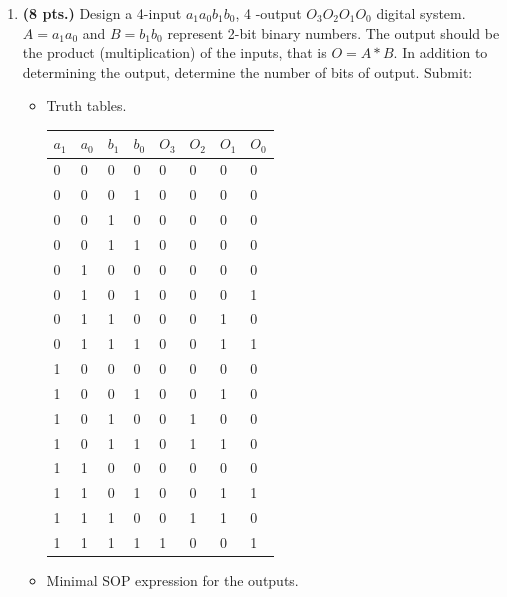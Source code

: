 \begin{enumerate}
\item {\bf (8 pts.)}
Design a 4-input $a_1 a_0 b_1 b_0$, 4 -output $O_3 O_2 O_1 O_0$
digital system.  $A=a_1 a_0$ and $B=b_1 b_0$ represent 2-bit binary
numbers.  The output should be the product (multiplication) of the inputs, 
that is $O = A*B$.  In addition to determining the output, determine the
number of bits of output. Submit:
\begin{itemize}
\item Truth tables.

\begin{solution}{
\begin{tabular}{l|l|l|l||l|l|l|l}
$a_1$ & $a_0$ & $b_1$ & $b_0$ & $O_3$ & $O_2$ & $O_1$ & $O_0$ \\ \hline
0&0&0&0 &0&0&0&0 \\ \hline
0&0&0&1 &0&0&0&0 \\ \hline
0&0&1&0 &0&0&0&0 \\ \hline
0&0&1&1 &0&0&0&0 \\ \hline
0&1&0&0 &0&0&0&0 \\ \hline
0&1&0&1 &0&0&0&1 \\ \hline
0&1&1&0 &0&0&1&0 \\ \hline
0&1&1&1 &0&0&1&1 \\ \hline
1&0&0&0 &0&0&0&0 \\ \hline
1&0&0&1 &0&0&1&0 \\ \hline
1&0&1&0 &0&1&0&0 \\ \hline
1&0&1&1 &0&1&1&0 \\ \hline
1&1&0&0 &0&0&0&0 \\ \hline
1&1&0&1 &0&0&1&1 \\ \hline
1&1&1&0 &0&1&1&0 \\ \hline
1&1&1&1 &1&0&0&1 \\
\end{tabular}
} \end{solution}

\item Minimal SOP expression for the outputs.


\end{itemize}
\end{enumerate}
